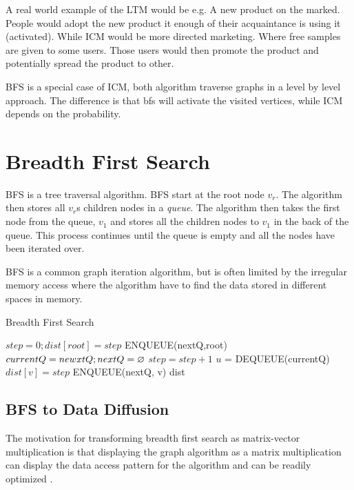 A real world example of the LTM would be e.g. A new product on the marked. People would adopt the new product it enough of their acquaintance is using it (activated). While ICM would be more directed marketing. Where free samples are given to some users. Those users would then promote the product and potentially spread the product to other.

BFS is a special case of ICM, both algorithm traverse graphs in a level by level approach. The difference is that bfs will activate the visited vertices, while ICM depends on the probability.


\section{Breadth First Search}
BFS is a tree traversal algorithm. BFS start at the root node \textit{$v_r$}. The algorithm then stores all $v_r$s children nodes in a \textit{queue}. The algorithm then takes the first node from the queue, \textit{$v_1$} and stores all the children nodes to \textit{$v_1$} in the back of the queue. This process continues until the queue is empty and all the nodes have been iterated over. 

BFS is a common graph iteration algorithm, but is often limited by the irregular memory access where the algorithm have to find the data stored in different spaces in memory.

\begin{algorithm}
\caption{Breadth First Search}
\begin{algorithmic}[1]
\State $step = 0; dist[root] = step$
\State ENQUEUE(nextQ,root)
\State $currentQ = newxtQ; nextQ = \oldemptyset$
\State $step = step+1$
\State$ u$ = DEQUEUE(currentQ)
\State $dist[v] = step$
\State ENQUEUE(nextQ, v)
\EndIf
\EndFor
\EndWhile
\EndWhile
\Return dist
\end{algorithmic}
\end{algorithm}


 
\subsection{BFS to Data Diffusion}

The motivation for transforming breadth first search as matrix-vector multiplication is that displaying the graph algorithm as a matrix multiplication can display the data access pattern for the algorithm and can be readily optimized  \cite{AlgoToMath}.

